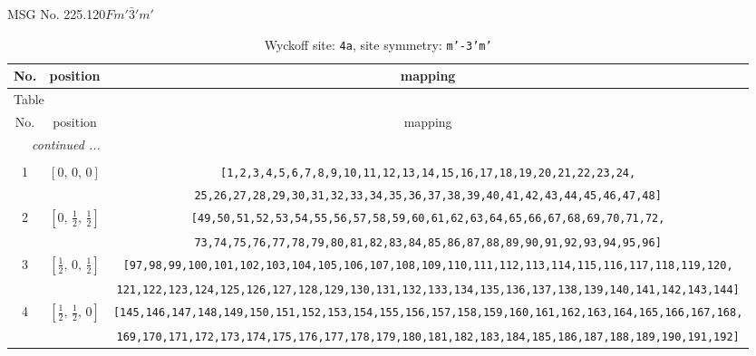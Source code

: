 \documentclass[fleqn,8pt]{jsarticle}
\begin{document}
\setcounter{MaxMatrixCols}{32}

\renewcommand{\tablename}{Table~}
\renewcommand{\figurename}{Figure~}
\begin{center}
\LARGE
MSG No. 225.120\quad$Fm'\bar{3}'m'$
\end{center}
\renewcommand{\arraystretch}{1.2}
\begin{longtable}{ccc}
\caption{Wyckoff site: {\tt 4a}, site symmetry: {\tt m'-3'm'}}
 \\
 \hline \hline
No. & position & mapping \\ \hline \endfirsthead

\multicolumn{2}{l}{\tablename\ \thetable{}} \\
 \hline \hline
No. & position & mapping \\ \hline \endhead

 \hline \hline
\multicolumn{2}{r}{\footnotesize\it continued ...} \\ \endfoot

 \hline \hline
\multicolumn{2}{r}{} \\ \endlastfoot

1 & $\left[ 0,\, 0,\, 0 \right]$ & {\tt [1,2,3,4,5,6,7,8,9,10,11,12,13,14,15,16,17,18,19,20,21,22,23,24,} \\ \hline
 &  & {\tt 25,26,27,28,29,30,31,32,33,34,35,36,37,38,39,40,41,42,43,44,45,46,47,48]} \\ \hline
2 & $\left[ 0,\, \frac{1}{2},\, \frac{1}{2} \right]$ & {\tt [49,50,51,52,53,54,55,56,57,58,59,60,61,62,63,64,65,66,67,68,69,70,71,72,} \\ \hline
 &  & {\tt 73,74,75,76,77,78,79,80,81,82,83,84,85,86,87,88,89,90,91,92,93,94,95,96]} \\ \hline
3 & $\left[ \frac{1}{2},\, 0,\, \frac{1}{2} \right]$ & {\tt [97,98,99,100,101,102,103,104,105,106,107,108,109,110,111,112,113,114,115,116,117,118,119,120,} \\ \hline
 &  & {\tt 121,122,123,124,125,126,127,128,129,130,131,132,133,134,135,136,137,138,139,140,141,142,143,144]} \\ \hline
4 & $\left[ \frac{1}{2},\, \frac{1}{2},\, 0 \right]$ & {\tt [145,146,147,148,149,150,151,152,153,154,155,156,157,158,159,160,161,162,163,164,165,166,167,168,} \\ \hline
 &  & {\tt 169,170,171,172,173,174,175,176,177,178,179,180,181,182,183,184,185,186,187,188,189,190,191,192]} \\
\end{longtable}
\renewcommand{\arraystretch}{1.2}
\end{document}
